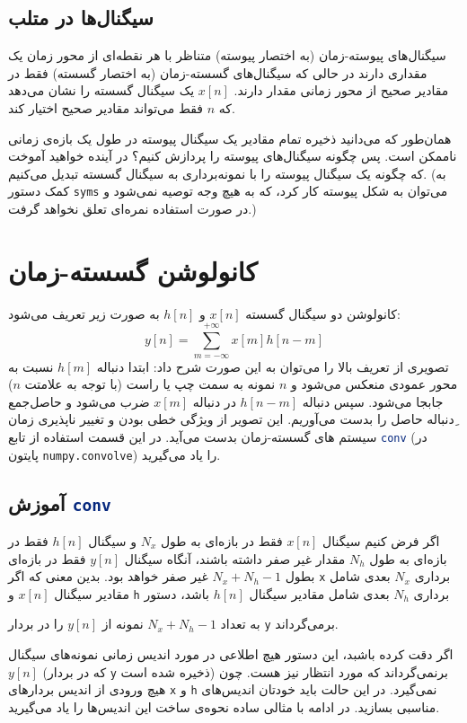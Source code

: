 \documentclass{utsignal}
\begin{document}
	\subsection{سیگنال‌ها در متلب}
	سیگنال‌های پیوسته-زمان  (به اختصار پیوسته) متناظر با هر نقطه‌ای از محور زمان یک مقداری دارند در حالی که سیگنال‌‌های گسسته-زمان (به اختصار گسسته) فقط در مقادیر صحیح از محور زمانی مقدار دارند. $x[n]$ یک سیگنال گسسته را نشان می‌دهد که $n$ فقط می‌تواند مقادیر صحیح اختیار کند.
	
	همان‌طور که می‌دانید ذخیره تمام مقادیر یک سیگنال پیوسته در طول یک بازه‌ی زمانی ناممکن است. پس چگونه سیگنال‌های پیوسته را پردازش کنیم؟ در آینده خواهید آموخت که چگونه یک سیگنال پیوسته را با نمونه‌برداری به سیگنال گسسته تبدیل می‌کنیم. (به کمک دستور \lstinline[language=Octave]{syms} می‌توان به شکل پیوسته کار کرد، که به هیچ وجه توصیه نمی‌شود و در صورت استفاده نمره‌ای تعلق نخواهد گرفت.)
	\section{کانولوشن گسسته-زمان}
	کانولوشن دو سیگنال گسسته $x[n]$ و $h[n]$ به صورت زیر تعریف می‌شود:
	$$y[n]=\sum_{m=-\infty}^{+\infty} x[m]h[n-m]$$
	تصویری از تعریف بالا را می‌توان به این صورت شرح داد: ابتدا دنباله  $h[m]$ نسبت به محور عمودی منعکس می‌شود و  $n$ نمونه به سمت چپ یا راست (با توجه به علامتت $n$) جابجا می‌شود. سپس دنباله  $h[n-m]$ در دنباله  $x[m]$ ضرب می‌شود و حاصل‌جمع ِدنباله حاصل را بدست می‌آوریم. این تصویر از ویژگی خطی بودن و تغییر ناپذیری زمان سیستم های گسسته-زمان بدست می‌آید. در این قسمت استفاده از تابع \lstinline[language=Octave]{conv} (در پایتون \lstinline[language=Python]{numpy.convolve}) را یاد می‌گیرید.
	\subsection{آموزش \lstinline[language=Octave]{conv}}
	اگر فرض کنیم سیگنال $x[n]$ فقط در بازه‌ای به طول $N_x$ و سیگنال $h[n]$ فقط در بازه‌ای به طول $N_h$ مقدار غیر صفر داشته باشند، آنگاه سیگنال $y[n]$ فقط در بازه‌ای بطول $N_x+N_h-1$ غیر صفر خواهد بود. بدین معنی که اگر  \lstinline[language=Octave]{x} برداری $N_x$ بعدی شامل مقادیر سیگنال  $x[n]$ و \lstinline[language=Octave]{h} برداری $N_h$ بعدی شامل مقادیر سیگنال $h[n]$ باشد، دستور 
	\begin{latin}
		
	\end{latin}
	\noindent به تعداد $N_x+N_h-1$ نمونه از $y[n]$ را در بردار \lstinline[language=Octave]{y} برمی‌گرداند.
	
	اگر دقت کرده باشبد، این دستور هیچ اطلاعی در مورد اندیس زمانی نمونه‌های سیگنال $y[n]$ (که در بردار \lstinline[language=Octave]{y} ذخیره شده است) برنمی‌گرداند که مورد انتظار نیز هست. چون هیچ ورودی از اندیس بردارهای \lstinline[language=Octave]{x} و \lstinline[language=Octave]{h} نمی‌گیرد. در این حالت باید خودتان اندیس‌‌های مناسبی بسازید. در ادامه با مثالی ساده نحوه‌ی ساخت این اندیس‌ها را یاد می‌گیرید.
	
\end{document}
